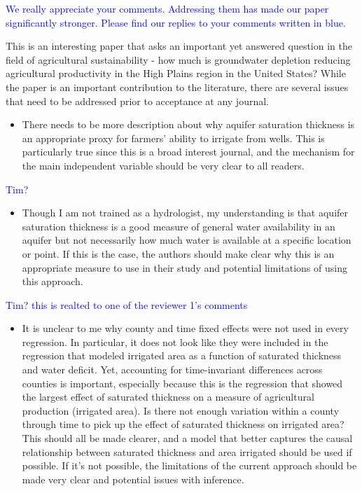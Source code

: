 \documentclass[
]{article}
\author{}
\date{\vspace{-2.5em}}
\providecommand{\tightlist}{%
  \setlength{\itemsep}{0pt}\setlength{\parskip}{0pt}}
\begin{document}
\textcolor{blue}{We really appreciate your comments. Addressing them has made our paper significantly stronger. Please find our replies to your comments written in blue.}

This is an interesting paper that asks an important yet answered
question in the field of agricultural sustainability - how much is
groundwater depletion reducing agricultural productivity in the High
Plains region in the United States? While the paper is an important
contribution to the literature, there are several issues that need to be
addressed prior to acceptance at any journal.

\begin{itemize}
\tightlist
\item
  There needs to be more description about why aquifer saturation
  thickness is an appropriate proxy for farmers' ability to irrigate
  from wells. This is particularly true since this is a broad interest
  journal, and the mechanism for the main independent variable should be
  very clear to all readers.
\end{itemize}

\textcolor{blue}{Tim?}

\begin{itemize}
\tightlist
\item
  Though I am not trained as a hydrologist, my understanding is that
  aquifer saturation thickness is a good measure of general water
  availability in an aquifer but not necessarily how much water is
  available at a specific location or point. If this is the case, the
  authors should make clear why this is an appropriate measure to use in
  their study and potential limitations of using this approach.
\end{itemize}

\textcolor{blue}{Tim? this is realted to one of the reviewer 1's comments}

\begin{itemize}
\tightlist
\item
  It is unclear to me why county and time fixed effects were not used in
  every regression. In particular, it does not look like they were
  included in the regression that modeled irrigated area as a function
  of saturated thickness and water deficit. Yet, accounting for
  time-invariant differences across counties is important, especially
  because this is the regression that showed the largest effect of
  saturated thickness on a measure of agricultural production (irrigated
  area). Is there not enough variation within a county through time to
  pick up the effect of saturated thickness on irrigated area? This
  should all be made clearer, and a model that better captures the
  causal relationship between saturated thickness and area irrigated
  should be used if possible. If it's not possible, the limitations of
  the current approach should be made very clear and potential issues
  with inference.
\end{itemize}
\end{document}
